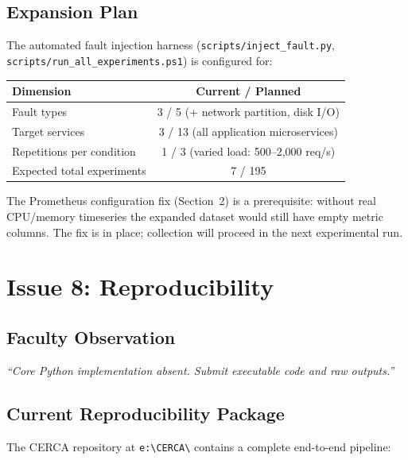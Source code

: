 \documentclass[11pt,a4paper]{article}
\newcommand{\tb}[1]{\textbf{#1}}
\begin{document}
\subsection{Expansion Plan}
The automated fault injection harness (\texttt{scripts/inject\_fault.py}, \texttt{scripts/run\_all\_experiments.ps1}) is configured for:

\begin{center}\small
\begin{tabular}{|l|c|}
\hline
\tb{Dimension} & \tb{Current / Planned} \\ \hline
Fault types & 3 / 5 (+ network partition, disk I/O) \\ \hline
Target services & 3 / 13 (all application microservices) \\ \hline
Repetitions per condition & 1 / 3 (varied load: 500--2,000 req/s) \\ \hline
Expected total experiments & 7 / 195 \\ \hline
\end{tabular}
\end{center}

The Prometheus configuration fix (Section~2) is a prerequisite: without real CPU/memory timeseries the expanded dataset would still have empty metric columns. The fix is in place; collection will proceed in the next experimental run.

\section{Issue 8: Reproducibility}

\subsection{Faculty Observation}
\textit{``Core Python implementation absent. Submit executable code and raw outputs.''}

\subsection{Current Reproducibility Package}
The CERCA repository at \texttt{e:\textbackslash CERCA\textbackslash} contains a complete end-to-end pipeline:
\end{document}
